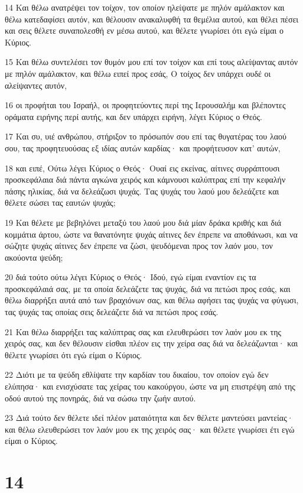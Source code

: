 \par 14 Και θέλω ανατρέψει τον τοίχον, τον οποίον ηλείψατε με πηλόν αμάλακτον και θέλω κατεδαφίσει αυτόν, και θέλουσιν ανακαλυφθή τα θεμέλια αυτού, και θέλει πέσει και σεις θέλετε συναπολεσθή εν μέσω αυτού, και θέλετε γνωρίσει ότι εγώ είμαι ο Κύριος.
\par 15 Και θέλω συντελέσει τον θυμόν μου επί τον τοίχον και επί τους αλείψαντας αυτόν με πηλόν αμάλακτον, και θέλω ειπεί προς εσάς, Ο τοίχος δεν υπάρχει ουδέ οι αλείψαντες αυτόν,
\par 16 οι προφήται του Ισραήλ, οι προφητεύοντες περί της Ιερουσαλήμ και βλέποντες οράματα ειρήνης περί αυτής, και δεν υπάρχει ειρήνη, λέγει Κύριος ο Θεός.
\par 17 Και συ, υιέ ανθρώπου, στήριξον το πρόσωπόν σου επί τας θυγατέρας του λαού σου, τας προφητευούσας εξ ιδίας αυτών καρδίας· και προφήτευσον κατ' αυτών,
\par 18 και ειπέ, Ούτω λέγει Κύριος ο Θεός· Ουαί εις εκείνας, αίτινες συρράπτουσι προσκεφάλαια διά πάντα αγκώνα χειρός και κάμνουσι καλύπτρας επί την κεφαλήν πάσης ηλικίας, διά να δελεάζωσι ψυχάς. Τας ψυχάς του λαού μου δελεάζετε και θέλετε σώσει τας εαυτών ψυχάς;
\par 19 Και θέλετε με βεβηλόνει μεταξύ του λαού μου διά μίαν δράκα κριθής και διά κομμάτια άρτου, ώστε να θανατόνητε ψυχάς αίτινες δεν έπρεπε να αποθάνωσι, και να σώζητε ψυχάς αίτινες δεν έπρεπε να ζώσι, ψευδόμεναι προς τον λαόν μου, τον ακούοντα ψεύδη;
\par 20 διά τούτο ούτω λέγει Κύριος ο Θεός· Ιδού, εγώ είμαι εναντίον εις τα προσκεφάλαιά σας, με τα οποία δελεάζετε τας ψυχάς, διά να πετώσι προς εσάς, και θέλω διαρρήξει αυτά από των βραχιόνων σας, και θέλω αφήσει τας ψυχάς να φύγωσι, τας ψυχάς τας οποίας σεις δελεάζετε διά να πετώσι προς εσάς.
\par 21 Και θέλω διαρρήξει τας καλύπτρας σας και ελευθερώσει τον λαόν μου εκ της χειρός σας, και δεν θέλουσιν είσθαι πλέον εις την χείρα σας διά να δελεάζωνται· και θέλετε γνωρίσει ότι εγώ είμαι ο Κύριος.
\par 22 Διότι με τα ψεύδη εθλίψατε την καρδίαν του δικαίου, τον οποίον εγώ δεν ελύπησα· και ενισχύσατε τας χείρας του κακούργου, ώστε να μη επιστρέψη από της οδού αυτού της πονηράς, διά να σώσω την ζωήν αυτού.
\par 23 Διά τούτο δεν θέλετε ιδεί πλέον ματαιότητα και δεν θέλετε μαντεύσει μαντείας· και θέλω ελευθερώσει τον λαόν μου εκ της χειρός σας· και θέλετε γνωρίσει έτι εγώ είμαι ο Κύριος.

\chapter{14}

